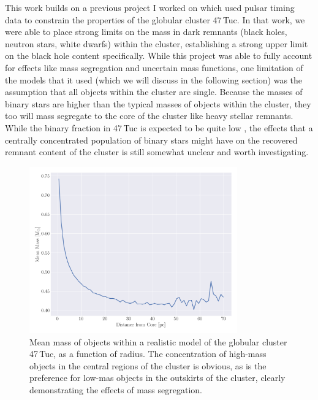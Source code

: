 This work builds on a previous project I worked on which used pulsar timing data to constrain the
properties of the globular cluster 47\,Tuc. In that work, we were able to place strong limits on the
mass in dark remnants (black holes, neutron stars, white dwarfs) within the cluster, establishing a
strong upper limit on the black hole content specifically. While this project was able to fully
account for effects like mass segregation and uncertain mass functions, one limitation of the models
that it used (which we will discuss in the following section) was the assumption that all objects
within the cluster are single. Because the masses of binary stars are higher than the typical masses
of objects within the cluster, they too will mass segregate to the core of the cluster like heavy
stellar remnants. While the binary fraction in 47\,Tuc is expected to be quite low
\citep{Milone2012}, the effects that a centrally concentrated population of binary stars might have
on the recovered remnant content of the cluster is still somewhat unclear and worth investigating.



\begin{figure}
	\centering
	\includegraphics[width=0.8\textwidth]{figures/radial_mean_mass.png}
	\caption{Mean mass of objects within a realistic model of the globular cluster 47\,Tuc, as a
		function of radius. The concentration of high-mass objects in the central regions of
		the cluster is obvious, as is the preference for low-mas objects in the outskirts of
		the cluster, clearly demonstrating the effects of mass segregation.}
	\label{fig:1/radial_mean_mass}
\end{figure}




